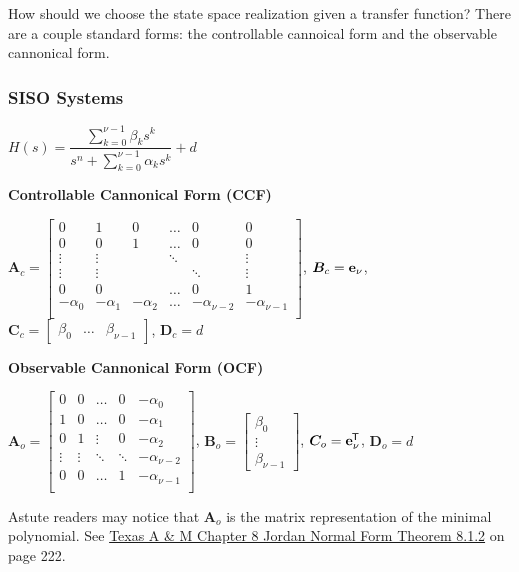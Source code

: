 \documentclass[11pt]{article}
\begin{document}
  How should we choose the state space realization given a transfer function? There are a couple standard forms:
  the controllable cannoical form and the observable cannonical form.

  \subsubsection{SISO Systems}

  \(H(s) =  \dfrac{\displaystyle \sum_{k = 0}^{\nu - 1} \beta_ks^k}{s^n + \displaystyle \sum_{k = 0}^{\nu - 1} \alpha_ks^k} + d\)

  \textbf{Controllable Cannonical Form (CCF)}

  \(\bm{A}_c =
  \begin{bmatrix}
    0 & 1 & 0 & \dots & 0 & 0 \\
    0 & 0 & 1 & \dots & 0 & 0 \\
    \vdots & \vdots & & \ddots & & \vdots \\
    \vdots & \vdots & & & \ddots & \vdots \\
    0 & 0 & & \dots & 0 & 1 \\
    -\alpha_0 & -\alpha_1 & -\alpha_2 & \dots & -\alpha_{\nu - 2} & -\alpha_{\nu - 1} \\
  \end{bmatrix}\),
  \(\bm{B}_c = \mathbf{e}_{\nu}\),
  \(\bm{C}_c = \begin{bmatrix} \beta_0 & \dots & \beta_{\nu - 1}\end{bmatrix}\),
  \(\bm{D}_c = d\)

  \textbf{Observable Cannonical Form (OCF)}

  \(\bm{A}_o =
  \begin{bmatrix}
    0 & 0 & \dots & 0 & -\alpha_0 \\
    1 & 0 & \dots & 0 & -\alpha_1 \\
    0 & 1 & \vdots & 0 & -\alpha_2 \\
    \vdots & \vdots & \ddots & \ddots & -\alpha_{\nu - 2} \\
    0 & 0 & \dots & 1 & -\alpha_{\nu - 1} \\
  \end{bmatrix}\),
  \(\bm{B}_o = \begin{bmatrix} \beta_0 \\ \vdots \\ \beta_{\nu - 1}\end{bmatrix}\),
  \(\bm{C}_o = \mathbf{e}_{\nu}^{\mkern-1.5mu\mathsf{T}}\),
  \(\bm{D}_o = d\)

  Astute readers may notice that \(\bm{A}_o\) is the matrix representation of the minimal polynomial. See
  \href{https://www.math.tamu.edu/~dallen/m640_03c/lectures/chapter8.pdf}{Texas A \& M Chapter 8 Jordan Normal Form Theorem 8.1.2}
  on page 222.
\end{document}
